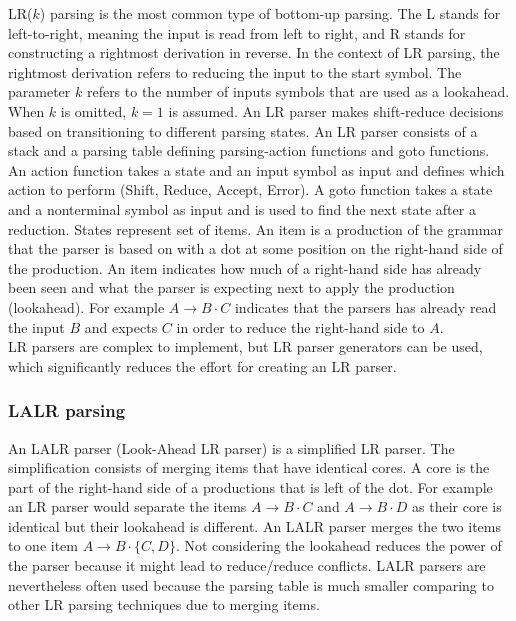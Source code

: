 LR($k$) parsing is the most common type of bottom-up parsing. The L stands for left-to-right, meaning the input is read from left to right, and R stands for constructing a rightmost derivation in reverse.
In the context of LR parsing, the rightmost derivation refers to reducing the input to the start symbol.
The parameter $k$ refers to the number of inputs symbols that are used as a lookahead. When $k$ is omitted, $k = 1$ is assumed.
An LR parser makes shift-reduce decisions based on transitioning to different parsing states.
An LR parser consists of a stack and a parsing table defining parsing-action functions and goto functions.
An action function takes a state and an input symbol as input and defines which action to perform (Shift, Reduce, Accept, Error).
A goto function takes a state and a nonterminal symbol as input and is used to find the next state after a reduction.
States represent set of items.
An item is a production of the grammar that the parser is based on with a dot at some position on the right-hand side of the production.
An item indicates how much of a right-hand side has already been seen and what the parser is expecting next to apply the production (lookahead).
For example $A \rightarrow B\cdot C$ indicates that the parsers has already read the input $B$ and expects $C$ in order to reduce the right-hand side to $A$.\cite{Aho.2007}\\
LR parsers are complex to implement, but LR parser generators can be used, which significantly reduces the effort for creating an LR parser.
\cite{Aho.2007}

\subsubsection{LALR parsing}\label{sec:BackgroundParserLALR}

An LALR parser (Look-Ahead LR parser) is a simplified LR parser.
The simplification consists of merging items that have identical cores.
A core is the part of the right-hand side of a productions that is left of the dot. 
For example an LR parser would separate the items $A \rightarrow B\cdot C$ and $A \rightarrow B\cdot D$ as their core is identical but their lookahead is different.
An LALR parser merges the two items to one item
$A \rightarrow B\cdot \{C,D\}$.
Not considering the lookahead reduces the power of the parser because it might lead to reduce/reduce conflicts.
LALR parsers are nevertheless often used because the parsing table is much smaller comparing to other LR parsing techniques  due to merging items.
\cite{Aho.2007}

